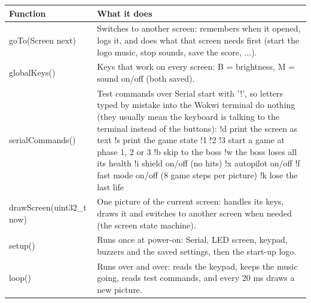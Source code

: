 \documentclass[11pt,a4paper]{article}
\begin{document}
\par\noindent\begin{minipage}{\linewidth}\centering\footnotesize
\begin{tabular}{|>{\raggedright\arraybackslash}p{5.82cm}|>{\raggedright\arraybackslash}p{10.68cm}|}
\hline\rowcolor{accent}\textbf{\color{white}Function} & \textbf{\color{white}What it does}\\\hline
goTo(Screen next) & Switches to another screen: remembers when it opened, logs it, and does what that screen needs first (start the logo music, stop sounds, save the score, ...).\\\hline
\rowcolor{rowshade}globalKeys() & Keys that work on every screen: B = brightness, M = sound on/off (both saved).\\\hline
serialCommands() & Test commands over Serial start with '!', so letters typed by mistake into the Wokwi terminal do nothing (they usually mean the keyboard is talking to the terminal instead of the buttons): !d  print the screen as text      !s  print the game state !1 !2 !3  start a game at phase 1, 2 or 3 !b  skip to the boss              !w  the boss loses all its health !i  shield on/off (no hits)       !x  autopilot on/off !f  fast mode on/off (8 game steps per picture) !k  lose the last life\\\hline
\rowcolor{rowshade}drawScreen(uint32\_t now) & One picture of the current screen: handles its keys, draws it and switches to another screen when needed (the screen state machine).\\\hline
setup() & Runs once at power-on: Serial, LED screen, keypad, buzzers and the saved settings, then the start-up logo.\\\hline
\rowcolor{rowshade}loop() & Runs over and over: reads the keypad, keeps the music going, reads test commands, and every 20 ms draws a new picture.\\\hline
\end{tabular}
\end{minipage}\par\medskip
\end{document}
